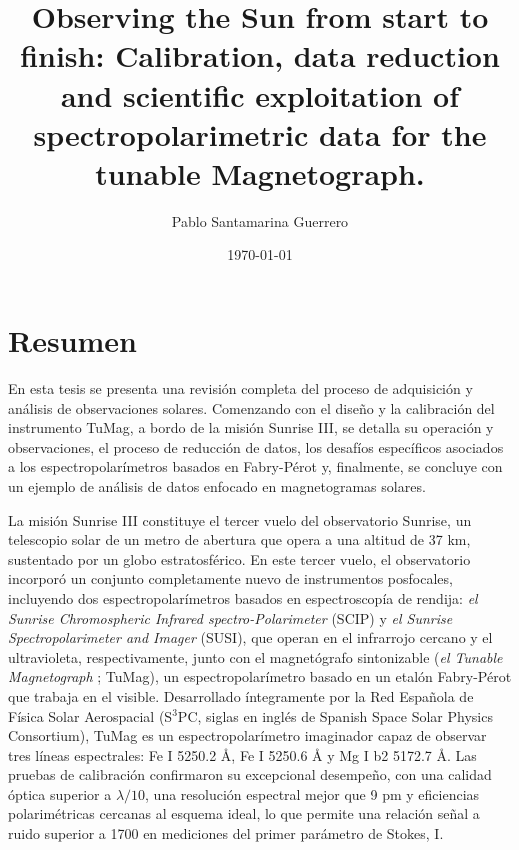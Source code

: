 \documentclass[12pt]{mythesis}
\title{Observing the Sun from start to finish: Calibration, data reduction and scientific exploitation of spectropolarimetric data for the tunable Magnetograph.}
\author{Pablo Santamarina Guerrero}
\date{\today}
\begin{document}
\frontmatter %
\maketitle
\cleardoublepage



\chapter*{Resumen}

En esta tesis se presenta una revisión completa del proceso de adquisición y análisis de observaciones solares. Comenzando con el diseño y la calibración del instrumento TuMag, a bordo de la misión Sunrise III, se detalla su operación y observaciones, el proceso de reducción de datos, los desafíos específicos asociados a los espectropolarímetros basados en Fabry-Pérot y, finalmente, se concluye con un ejemplo de análisis de datos enfocado en magnetogramas solares.

La misión Sunrise III constituye el tercer vuelo del observatorio Sunrise, un telescopio solar de un metro de abertura que opera a una altitud de 37 km, sustentado por un globo estratosférico. En este tercer vuelo, el observatorio incorporó un conjunto completamente nuevo de instrumentos posfocales, incluyendo dos espectropolarímetros basados en espectroscopía de rendija: \textit{el Sunrise Chromospheric Infrared spectro-Polarimeter} (SCIP) y \textit{el Sunrise Spectropolarimeter and Imager} (SUSI), que operan en el infrarrojo cercano y el ultravioleta, respectivamente, junto con el magnetógrafo sintonizable (\textit{el Tunable Magnetograph} ; TuMag), un espectropolarímetro basado en un etalón Fabry-Pérot que trabaja en el visible. Desarrollado íntegramente por la Red Española de Física Solar Aerospacial (S$^3$PC, siglas en inglés de Spanish Space Solar Physics Consortium), TuMag es un espectropolarímetro imaginador capaz de observar tres líneas espectrales: Fe I 5250.2 Å, Fe I 5250.6 Å y Mg I b2 5172.7 Å. Las pruebas de calibración confirmaron su excepcional desempeño, con una calidad óptica superior a $\lambda/10$, una resolución espectral mejor que 9 pm y eficiencias polarimétricas cercanas al esquema ideal, lo que permite una relación señal a ruido superior a 1700 en mediciones del primer parámetro de Stokes, I.
\end{document}
